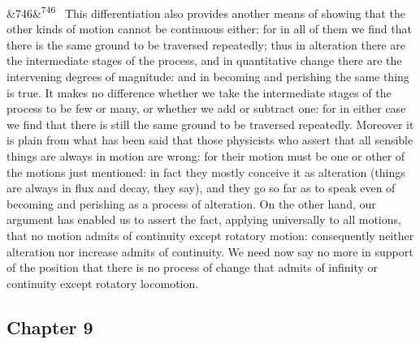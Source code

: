 \documentclass[12pt]{article}
\newcommand{\para}[1][]{\par\noindent\ifx&#1&\else\textsuperscript{\footnotesize #1}~\fi}
\begin{document}
\para[746] This differentiation also provides another means of showing that the other kinds of motion cannot be continuous either: for in all of them we find that there is the same ground to be traversed repeatedly; thus in alteration there are the intermediate stages of the process, and in quantitative change there are the intervening degrees of magnitude: and in becoming and perishing the same thing is true. It makes no difference whether we take the intermediate stages of the process to be few or many, or whether we add or subtract one: for in either case we find that there is still the same ground to be traversed repeatedly. Moreover it is plain from what has been said that those physicists who assert that all sensible things are always in motion are wrong: for their motion must be one or other of the motions just mentioned: in fact they mostly conceive it as alteration (things are always in flux and decay, they say), and they go so far as to speak even of becoming and perishing as a process of alteration. On the other hand, our argument has enabled us to assert the fact, applying universally to all motions, that no motion admits of continuity except rotatory motion: consequently neither alteration nor increase admits of continuity. We need now say no more in support of the position that there is no process of change that admits of infinity or continuity except rotatory locomotion.

\subsection*{Chapter 9}
\end{document}
